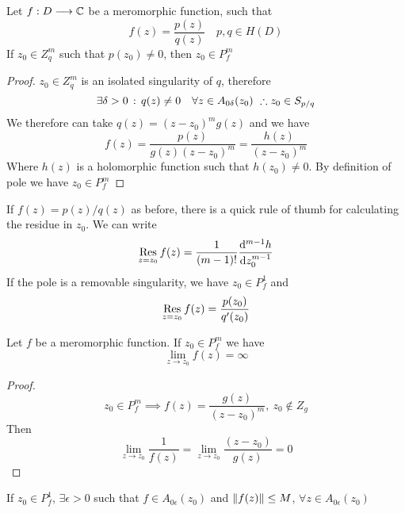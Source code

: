 \documentclass[../complete.tex]{subfiles}
\begin{document}
\begin{thm}
	Let $f:D\overset{}{\longrightarrow}\mathbb{C}$ be a meromorphic function, such that
	\begin{equation*}
		f(z)=\frac{p(z)}{q(z)}\quad p,q\in H(D)
	\end{equation*}
	If $z_0\in Z_q^m$ such that $p(z_0)\ne0$, then $z_0\in P^m_f$
\end{thm}
\begin{proof}
	$z_0\in Z_q^m$ is an isolated singularity of $q$, therefore
	\begin{equation*}
		\exists\delta>0\, :\,  q(z)\ne0\quad\forall z\in A_{0\delta}(z_0)\ \therefore z_0\in S_{p/q}
	\end{equation*}
	We therefore can take $q(z)=(z-z_0)^mg(z)$ and we have
	\begin{equation*}
		f(z)=\frac{p(z)}{g(z)(z-z_0)^m}=\frac{h(z)}{(z-z_0)^m}
	\end{equation*}
	Where $h(z)$ is a holomorphic function such that $h(z_0)\ne0$. By definition of pole we have $z_0\in P^m_f$
\end{proof}
\begin{thm}
	If $f(z)=p(z)/q(z)$ as before, there is a quick rule of thumb for calculating the residue in $z_0$. We can write
	\begin{equation*}
		\res_{z=z_0}f(z)=\frac{1}{(m-1)!}\derivative[m-1]{h}{z_0}
	\end{equation*}
	If the pole is a removable singularity, we have $z_0\in P^1_f$ and
	\begin{equation*}
		\operatorname*{\mathrm{Res}}_{z=z_0}f(z)=\frac{p(z_0)}{q'(z_0)}
	\end{equation*}
\end{thm}
\begin{thm}
	Let $f$ be a meromorphic function. If $z_0\in P^m_f$ we have
	\begin{equation*}
		\lim_{z\to z_0}f(z)=\infty
	\end{equation*}
\end{thm}
\begin{proof}
	\begin{equation*}
		z_0\in P^m_f\implies f(z)=\frac{g(z)}{(z-z_0)^m},\ z_0\notin Z_g
	\end{equation*}
	Then
	\begin{equation*}
		\lim_{z\to z_0}\frac{1}{f(z)}=\lim_{z\to z_0}\frac{(z-z_0)}{g(z)}=0
	\end{equation*}
\end{proof}
\begin{thm}
	If $z_0\in P^1_f$, $\exists\epsilon>0$ such that $f\in A_{0\epsilon}(z_0)$ and $\norm{f(z)}\le M$, $\forall z\in A_{0\epsilon}(z_0)$
\end{thm}
\end{document}
